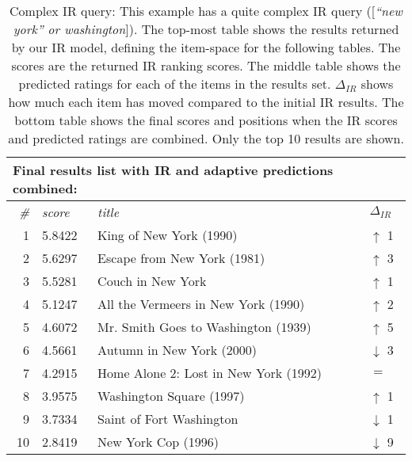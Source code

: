 \begin{table}[h]
  \vspace{1em} 

  \begin{tabular*}{0.9\textwidth}{ r l p{8.5cm} l }
    \multicolumn{4}{l}{Final results list with IR and adaptive predictions combined:}\\
    \toprule
    \emph{\#} & \emph{score} & \emph{title} & $\Delta_{IR}$ \\
    \midrule
    1 & 5.8422  &  King of New York (1990)                & \color{green} $\uparrow$ 1 \\
    2 & 5.6297  &  Escape from New York (1981)            & \color{green} $\uparrow$ 3 \\
    3 & 5.5281  &  Couch in New York                      & \color{green} $\uparrow$ 1 \\
    4 & 5.1247  &  All the Vermeers in New York (1990)    & \color{green} $\uparrow$ 2 \\
    5 & 4.6072  &  Mr. Smith Goes to Washington (1939)    & \color{green} $\uparrow$ 5 \\
    6 & 4.5661  &  Autumn in New York (2000)              & \color{red} $\downarrow$ 3 \\
    7 & 4.2915  &  Home Alone 2: Lost in New York (1992)  & \color{black} $=$ \\
    8 & 3.9575  &  Washington Square (1997)               & \color{green} $\uparrow$ 1 \\
    9 & 3.7334  &  Saint of Fort Washington               & \color{red} $\downarrow$ 1 \\
    10& 2.8419  &  New York Cop (1996)                    & \color{red} $\downarrow$ 9 \\
    \bottomrule
  \end{tabular*}

  \vspace{1em}
  \caption[Complex IR Query]{
    Complex IR query: This example has a quite complex IR query ([\emph{``new york'' or washington}]).
    The top-most table shows the results returned by our IR model, defining the item-space for the following tables.
    The scores are the returned IR ranking scores.
    The middle table shows the predicted ratings for each of the items in the results set.
    $\Delta_{IR}$ shows how much each item has moved compared to the initial IR results.
    The bottom table shows the final scores and positions when the IR scores and predicted ratings are combined.
    Only the top 10 results are shown.
  }
  \label{table:rank:washington}
\end{table}

